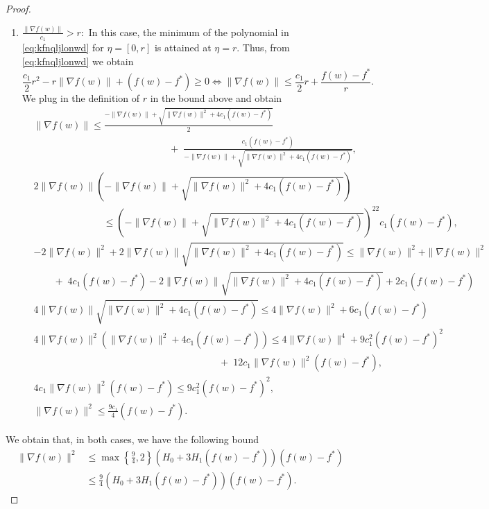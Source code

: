 \documentclass[a4paper,11pt]{article}
\newcommand{\1}{\mathbbm{1}}
\theoremstyle{plain}
\begin{document}
\begin{proof}
\begin{enumerate}
    \item $\frac{\|\nabla f(w)\|}{c_1} > r:$ In this case, the minimum of the polynomial in \eqref{eq:kfnqljlonwd} for $\eta = [0,r]$ is attained at $\eta=r$. Thus, from \eqref{eq:kfnqljlonwd} we obtain
    \[
    \frac{c_1}{2}r^2 - r\|\nabla f(w)\| + (f(w) - f^*) \ge 0 \Leftrightarrow \|\nabla f(w)\| \le \frac{c_1}{2}r + \frac{f(w) - f^*}{r}.
    \]
    We plug in the definition of $r$ in the bound above and obtain
    \begin{align*}
        &\|\nabla f(w)\| \le \frac{-\|\nabla f(w)\| + \sqrt{\|\nabla f(w)\|^2 + 4c_1(f(w) - f^*)}}{2}\\
        &\hspace{5cm}\qquad +\; \frac{c_1(f(w)-f^*)}{-\|\nabla f(w)\| + \sqrt{\|\nabla f(w)\|^2 + 4c_1(f(w) - f^*)}},\\
        &2\|\nabla f(w)\|(-\|\nabla f(w)\| + \sqrt{\|\nabla f(w)\|^2 + 4c_1(f(w) - f^*)})\\
        &\hspace{3cm}\le (-\|\nabla f(w)\| + \sqrt{\|\nabla f(w)\|^2 + 4c_1(f(w) - f^*)})^22c_1(f(w)-f^*),\\
        &-2\|\nabla f(w)\|^2 + 2\|\nabla f(w)\|\sqrt{\|\nabla f(w)\|^2 + 4c_1(f(w)-f^*)} \le \|\nabla f(w)\|^2 + \|\nabla f(w)\|^2 \\
        &\qquad +\;
        4c_1(f(w)-f^*) 
        - 2\|\nabla f(w)\|\sqrt{\|\nabla f(w)\|^2 + 4c_1(f(w)- f^*)} + 2c_1(f(w) - f^*)\\
        &4\|\nabla f(w)\|\sqrt{\|\nabla f(w)\|^2 + 4c_1(f(w)-f^*)} \le 4\|\nabla f(w)\|^2 + 6c_1(f(w) - f^*)\\
        &4\|\nabla f(w)\|^2(\|\nabla f(w)\|^2 + 4c_1(f(w)-f^*)) \le 4\|\nabla f(w)\|^4 + 9c_1^2(f(w)-f^*)^2\\
        &\hspace{8cm}+\; 12c_1\|\nabla f(w)\|^2(f(w)-f^*),\\
        &4c_1\|\nabla f(w)\|^2(f(w)-f^*) \le 9c_1^2(f(w) - f^*)^2,\\
        &\|\nabla f(w)\|^2 \le \frac{9c_1}{4}(f(w) - f^*).
    \end{align*}
    \end{enumerate}
    
    We obtain that, in both cases, we have the following bound
    \begin{align*}
        \|\nabla f(w)\|^2 
        &\le \max\left\{\frac{9}{4}, 2\right\}(H_0 + 3H_1(f(w) - f^*))(f(w) - f^*)\\
        &\le \frac{9}{4}(H_0 + 3H_1(f(w) - f^*))(f(w) - f^*).
    \end{align*}
    
    
\end{proof}
\end{document}

